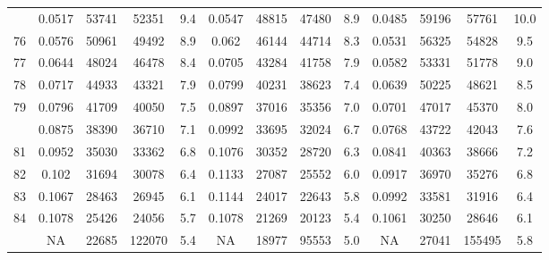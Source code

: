 \documentclass[
  14pt,
]{article}
\begin{document}
\begin{longtable}[t]{lcccccccccccc}
\addlinespace
75 & 0.0517 & 53741 & 52351 & 9.4 & 0.0547 & 48815 & 47480 & 8.9 & 0.0485 & 59196 & 57761 & 10.0\\
76 & 0.0576 & 50961 & 49492 & 8.9 & 0.062 & 46144 & 44714 & 8.3 & 0.0531 & 56325 & 54828 & 9.5\\
77 & 0.0644 & 48024 & 46478 & 8.4 & 0.0705 & 43284 & 41758 & 7.9 & 0.0582 & 53331 & 51778 & 9.0\\
78 & 0.0717 & 44933 & 43321 & 7.9 & 0.0799 & 40231 & 38623 & 7.4 & 0.0639 & 50225 & 48621 & 8.5\\
79 & 0.0796 & 41709 & 40050 & 7.5 & 0.0897 & 37016 & 35356 & 7.0 & 0.0701 & 47017 & 45370 & 8.0\\
\addlinespace
80 & 0.0875 & 38390 & 36710 & 7.1 & 0.0992 & 33695 & 32024 & 6.7 & 0.0768 & 43722 & 42043 & 7.6\\
81 & 0.0952 & 35030 & 33362 & 6.8 & 0.1076 & 30352 & 28720 & 6.3 & 0.0841 & 40363 & 38666 & 7.2\\
82 & 0.102 & 31694 & 30078 & 6.4 & 0.1133 & 27087 & 25552 & 6.0 & 0.0917 & 36970 & 35276 & 6.8\\
83 & 0.1067 & 28463 & 26945 & 6.1 & 0.1144 & 24017 & 22643 & 5.8 & 0.0992 & 33581 & 31916 & 6.4\\
84 & 0.1078 & 25426 & 24056 & 5.7 & 0.1078 & 21269 & 20123 & 5.4 & 0.1061 & 30250 & 28646 & 6.1\\
\addlinespace
85 & NA & 22685 & 122070 & 5.4 & NA & 18977 & 95553 & 5.0 & NA & 27041 & 155495 & 5.8\\*
\end{longtable}
\end{document}
